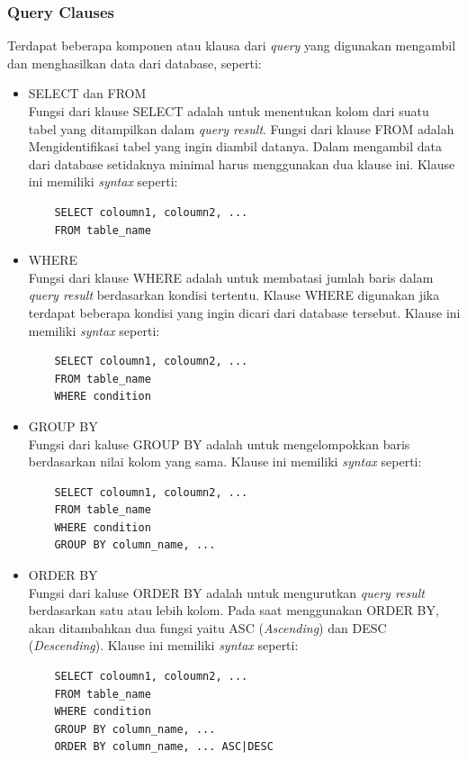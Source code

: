 \subsubsection{Query Clauses}
Terdapat beberapa komponen atau klausa dari \textit{query} yang digunakan mengambil dan menghasilkan data dari database, seperti:
\begin{itemize}
    \item SELECT dan FROM\\
    Fungsi dari klause SELECT adalah untuk menentukan kolom dari suatu tabel yang ditampilkan dalam \textit{query result}. Fungsi dari klause FROM adalah Mengidentifikasi tabel yang ingin diambil datanya. Dalam mengambil data dari database setidaknya minimal harus menggunakan dua klause ini. Klause ini memiliki \textit{syntax} seperti:
    \begin{verbatim}
    SELECT coloumn1, coloumn2, ...
    FROM table_name
    \end{verbatim}
    
    \item WHERE\\
    Fungsi dari klause WHERE adalah untuk membatasi jumlah baris dalam \textit{query result} berdasarkan kondisi tertentu. Klause WHERE digunakan jika terdapat beberapa kondisi yang ingin dicari dari database tersebut. Klause ini memiliki \textit{syntax} seperti:
    \begin{verbatim}
    SELECT coloumn1, coloumn2, ...
    FROM table_name
    WHERE condition
\end{verbatim}
    
    \item GROUP BY\\
    Fungsi dari kaluse GROUP BY adalah untuk mengelompokkan baris berdasarkan nilai kolom yang sama. Klause ini memiliki \textit{syntax} seperti:
    \begin{verbatim}
    SELECT coloumn1, coloumn2, ...
    FROM table_name
    WHERE condition
    GROUP BY column_name, ...
\end{verbatim}
    
    \item ORDER BY\\
    Fungsi dari kaluse ORDER BY adalah untuk mengurutkan \textit{query result} berdasarkan satu atau lebih kolom. Pada saat menggunakan ORDER BY, akan ditambahkan dua fungsi yaitu ASC (\textit{Ascending}) dan DESC (\textit{Descending}). Klause ini memiliki \textit{syntax} seperti:
    \begin{verbatim}
    SELECT coloumn1, coloumn2, ...
    FROM table_name
    WHERE condition
    GROUP BY column_name, ...
    ORDER BY column_name, ... ASC|DESC
\end{verbatim}
\end{itemize}



